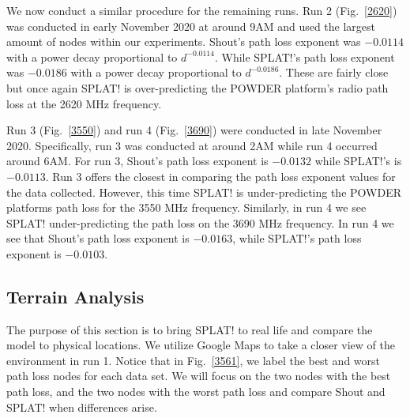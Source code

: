 We now conduct a similar procedure for the remaining runs. Run 2 (Fig.~\ref{2620}) was conducted in early November 2020 at
around 9AM and used the largest amount of nodes within our experiments. Shout's path loss exponent was $-0.0114$ with a power 
decay proportional to $d^{-0.0114}$. While SPLAT!'s path loss exponent was $-0.0186$ with a power decay proportional to 
$d^{-0.0186}$. These are fairly close but once again SPLAT! is over-predicting the POWDER platform's radio path loss at the 2620 
MHz frequency. 

Run 3 (Fig.~\ref{3550}) and run 4 (Fig.~\ref{3690}) were conducted in late November 2020. Specifically, run 3 was 
conducted at around 2AM while run 4 occurred around 6AM. For run 3, Shout's path loss exponent is $-0.0132$ while SPLAT!'s 
is $-0.0113$. Run 3 offers the closest in comparing the path loss exponent values for the data collected. However, this time SPLAT! 
is under-predicting the POWDER platforms path loss for the 3550 MHz frequency. Similarly, in run 4 we see SPLAT! under-predicting
the path loss on the 3690 MHz frequency. In run 4 we see that Shout's path loss exponent is $-0.0163$, while SPLAT!'s path loss 
exponent is $-0.0103$. 

\subsection{Terrain Analysis}
The purpose of this section is to bring SPLAT! to real life and compare the model to physical locations. We utilize Google 
Maps to take a closer view of the environment in run 1. Notice that in Fig.~\ref{3561}, we label the best and worst path loss 
nodes for each data set. We will focus on the two nodes with the best path loss, and the two nodes with the worst path loss and 
compare Shout and SPLAT! when differences arise. 

